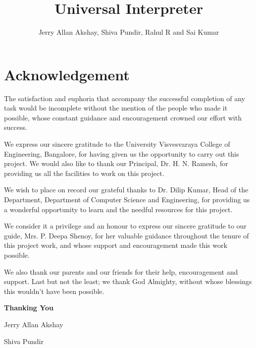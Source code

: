 \documentclass[14pt]{report}
\title{Universal Interpreter}
\author{Jerry Allan Akshay, Shiva Pundir, Rahul R and Sai Kumar}
\begin{document}


 	\maketitle

	\newpage


	\chapter*{Acknowledgement}\label{chapter}
		

		The satisfaction and euphoria that accompany the successful completion of any task would be incomplete without the mention of the people who made it possible, whose constant guidance and encouragement crowned our effort with success. \newline
		 
		We express our sincere gratitude to the University Visvesvaraya College of Engineering, Bangalore, for having given us the opportunity to carry out this project. We would also like to thank our Principal, Dr. H. N. Ramesh, for providing us all the facilities to work on this project. \newline
	 
		We wish to place on record our grateful thanks to Dr. Dilip Kumar, Head of the Department, Department of Computer Science and Engineering, for providing us a wonderful opportunity to learn and the needful resources for this project. \newline 
	 
		We consider it a privilege and an honour to express our sincere gratitude to our guide, Mrs. P. Deepa Shenoy, for her valuable guidance throughout the tenure of this project work, and whose support and encouragement made this work possible.  \newline
	 
		We also thank our parents and our friends for their help, encouragement and support. Last but not the least; we thank God Almighty, without whose blessings this wouldn't have been possible. \newline 

		\hfill \textbf{Thanking You} 

		\hfill Jerry Allan Akshay 

		\hfill Shiva Pundir 
\end{document}
